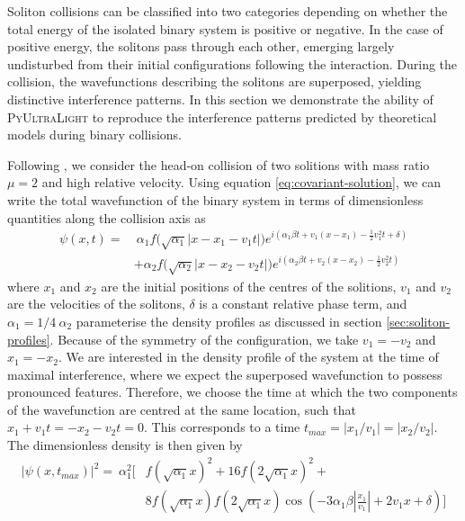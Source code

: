 \documentclass[a4paper,11pt]{article}
\newcommand{\PyUltraLight}{\textsc{PyUltraLight }}
\begin{document}
Soliton collisions can be classified into two categories depending on whether the total energy of the isolated binary system is positive or negative. In the case of positive energy, the solitons pass through each other, emerging largely undisturbed from their initial configurations following the interaction. During the collision, the wavefunctions describing the solitons are superposed, yielding distinctive interference patterns. In this section we demonstrate the ability of \PyUltraLight to reproduce the interference patterns predicted by theoretical models during binary collisions. 

Following \cite{Schwabe2016}, we consider the head-on collision of two solitions with mass ratio $\mu=2$ and high relative velocity. Using equation \ref{eq:covariant-solution}, we can write the total wavefunction of the binary system in terms of dimensionless quantities along the collision axis as
\begin{align}
    \psi(x,t)=& \ \alpha_1 f\big(\sqrt{\alpha_1}\vert x-x_1-v_1 t\vert\big)e^{i\left(\alpha_1\beta t+v_1(x-x_1)-\frac{1}{2}v_1^2 t+\delta\right)}\nonumber\\
    &+\alpha_2 f\big(\sqrt{\alpha_2}\vert x-x_2-v_2 t\vert\big)e^{i\left(\alpha_2\beta t+v_2(x-x_2)-\frac{1}{2}v_2^2 t\right)}
\end{align}
where $x_1$ and $x_2$ are the initial positions of the centres of the solitions, $v_1$ and $v_2$ are the velocities of the solitons, $\delta$ is a constant relative phase term, and $\alpha_1=1/4 \ \alpha_2$ parameterise the density profiles as discussed in section \ref{sec:soliton-profiles}. Because of the symmetry of the configuration, we take $v_1=-v_2$ and $x_1=-x_2$. We are interested in the density profile of the system at the time of maximal interference, where we expect the superposed wavefunction to possess pronounced features. Therefore, we choose the time at which the two components of the wavefunction are centred at the same location, such that $x_1+v_1t=-x_2-v_2t=0$. This corresponds to a time $t_{max}=\vert x_1/v_1\vert = \vert x_2/v_2\vert$. The dimensionless density is then given by
\begin{align}\label{eq:predicted-interference}
    \vert\psi(x,t_{max})\vert^2= \ \alpha_1^2\bigg[&f(\sqrt{\alpha_1}x)^2+16f(2\sqrt{\alpha_1}x)^2+\nonumber\\
    &8f(\sqrt{\alpha_1}x)f(2\sqrt{\alpha_1}x)\operatorname{cos}\left(-3\alpha_1\beta\left\vert\frac{x_1}{v_1}\right\vert+2v_1x+\delta \right)\bigg]
\end{align}
\end{document}
